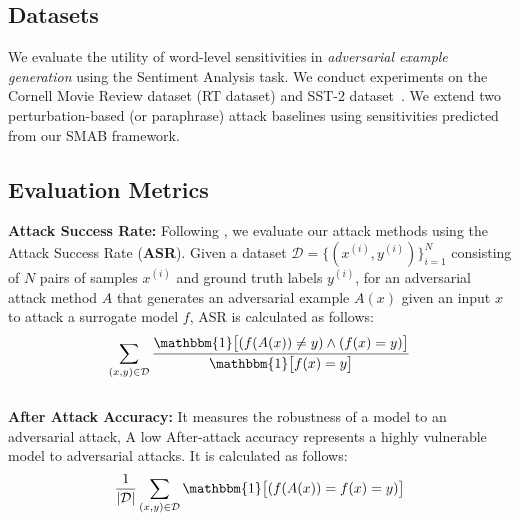 \subsection{Datasets} 
We evaluate the utility of word-level sensitivities in \textit{adversarial example generation} using the Sentiment Analysis task. We conduct experiments on the Cornell Movie Review dataset (RT dataset) \cite{pang-lee-2005-seeing} and SST-2 dataset~\cite{socher2013recursive}. We extend two perturbation-based (or paraphrase) attack baselines using sensitivities predicted from our SMAB framework.

\subsection{Evaluation Metrics}
\textbf{Attack Success Rate:} Following \citet{wang-etal-2018-glue}, we evaluate our attack methods using the Attack Success Rate (\textbf{ASR}). Given a dataset $\mathcal{D} = \{(x^{(i)}, y^{(i)})\}_{i=1}^{N}$ consisting of $N$ pairs of samples $x^{(i)}$ and ground truth labels $y^{(i)}$, for an adversarial attack method $A$ that generates an adversarial example $A(x)$ given an input $x$ to attack a surrogate model $f$, ASR is calculated as follows: \\
\begin{equation}
    \sum_{(x,y) \in \mathcal{D}}
    \frac{\mathbbm{1} \big[ (f(A(x)) \neq y)
                      \land (f(x) =y)\big]}
                      {\mathbbm{1} \big[ f(x) = y \big]}
    \label{eq:ASR}
\end{equation}\\
\textbf{After Attack Accuracy:} It measures the robustness of a model to an adversarial attack, A low After-attack accuracy represents a highly vulnerable model to adversarial attacks. It is calculated as follows: \\
\begin{equation}
    \frac{1}{|\mathcal{D}|} \sum_{(x,y) \in \mathcal{D}}
    \mathbbm{1} \big[ (f(A(x)) = f(x) = y) \big]
    \label{eq:AAA}
\end{equation}

